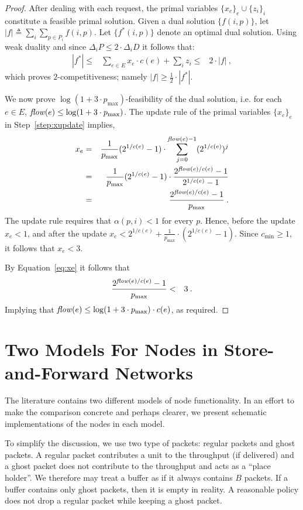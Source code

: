\documentclass[11pt]{article}
\newcommand{\flow}{\text{\emph{flow}}}
\newcommand{\pmax}{p_{\max}}
\newenvironment{proof sketch}[1]{\noindent {\emph{Proof sketch of #1:}}}{\hfill \qed}
\begin{document}
\begin{proof}
After dealing with each request, the primal variables $\{x_{e}\}_{e} \cup
\{z_{i}\}_{i}$ constitute a feasible primal solution. Given a dual solution
$\{f(i,p)\}$, let $|f|\triangleq\sum_{i}\sum_{p\in P_{i}} f(i,p)$. Let $\{f^*(i,p)\}$
denote an optimal dual solution.  Using weak duality and since $\Delta_i P \leq
2\cdot \Delta_i D$ it follows that:
        \begin{eqnarray}
        |f^*| \leq & \sum_{e\in E} x_{e}\cdot c(e)+\sum_{i}z_{i} \leq & 2\cdot|f|\:,
        \end{eqnarray}
    which proves $2$-competitiveness; namely $|f|\geq \frac{1}{2}\cdot|f^*|$.

    We now prove $\log (1+3 \cdot \pmax)$-feasibility of the dual solution, i.e. for each $e\in E$, $\flow(e) \leq \log (1+3 \cdot \pmax)$.
    The update rule of the primal variables $\{x_e\}_e$ in Step~\ref{step:xupdate} implies,
     \begin{eqnarray}
\nonumber        x_{e} & = & \frac{1}{\pmax}(2^{1/c(e)}-1)\cdot \sum_{j=0}^{\flow(e)-1}(2^{1/c(e)})^j \\
\nonumber              & = & \frac{1}{\pmax}(2^{1/c(e)}-1)\cdot
              \frac{2^{\flow(e)/c(e)}-1}{2^{1/c(e)}-1}\\
\label{eq:xe}              & = & \frac{2^{\flow(e)/c(e)}-1}{\pmax}\:.
     \end{eqnarray} The update rule requires that $\alpha(p,i)<1$ for every $p$.  Hence, before the
     update $x_e<1$, and after the update $x_e < 2^{1/c(e)}+\frac{1}{\pmax}\cdot
     (2^{1/c(e)}-1)$.  Since $c_{\min} \geq 1$, it follows that $x_e<3$.

By Equation~\eqref{eq:xe} it follows that
    \begin{eqnarray*}
    \frac{2^{\flow(e)/c(e)}-1}{\pmax}&<& 3\:.
    \end{eqnarray*}
    Implying that $\flow(e) \leq \log (1+3 \cdot \pmax)\cdot c(e)$, as required.
\end{proof}


\section{Two Models For Nodes in Store-and-Forward Networks}\label{sec:model}
\newcommand{\comb}{\text{\emph{comb}}} The literature contains two
different models of node functionality. In an effort to make the
comparison concrete and perhaps clearer, we present schematic
implementations of the nodes in each model.

To simplify the discussion, we use two type of packets: regular packets and ghost
packets. A regular packet contributes a unit to the throughput (if delivered) and a
ghost packet does not contribute to the throughput and acts as a ``place holder''.
We therefore may treat a buffer as if it always contains $B$ packets.
If a buffer contains only ghost packets, then it is empty in reality.
A reasonable policy does not drop a regular packet while keeping a ghost packet.
\end{document}
